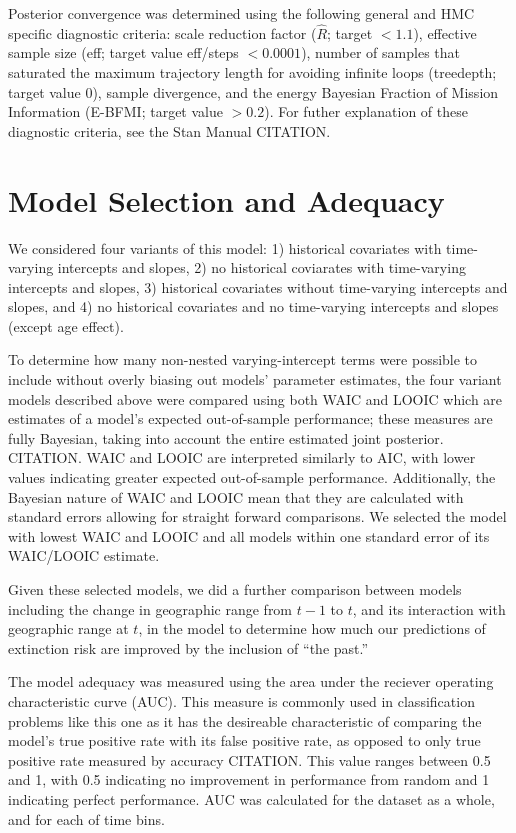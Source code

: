 \documentclass[12pt,letterpaper]{article}
\begin{document}
Posterior convergence was determined using the following general and HMC specific diagnostic criteria: scale reduction factor (\(\hat{R}\); target \(<1.1\)), effective sample size (eff; target value eff/steps \(<0.0001\)), number of samples that saturated the maximum trajectory length for avoiding infinite loops (treedepth; target value 0), sample divergence, and the energy Bayesian Fraction of Mission Information (E-BFMI; target value \(>0.2\)). For futher explanation of these diagnostic criteria, see the Stan Manual CITATION.


\section{Model Selection and Adequacy}

We considered four variants of this model: 1) historical covariates with time-varying intercepts and slopes, 2) no historical coviarates with time-varying intercepts and slopes, 3) historical covariates without time-varying intercepts and slopes, and 4) no historical covariates and no time-varying intercepts and slopes (except age effect).

To determine how many non-nested varying-intercept terms were possible to include without overly biasing out models' parameter estimates, the four variant models described above were compared using both WAIC and LOOIC which are estimates of a model's expected out-of-sample performance; these measures are fully Bayesian, taking into account the entire estimated joint posterior. CITATION. WAIC and LOOIC are interpreted similarly to AIC, with lower values indicating greater expected out-of-sample performance. Additionally, the Bayesian nature of WAIC and LOOIC mean that they are calculated with standard errors allowing for straight forward comparisons. We selected the model with lowest WAIC and LOOIC and all models within one standard error of its WAIC/LOOIC estimate.

Given these selected models, we did a further comparison between models including the change in geographic range from \(t - 1\) to \(t\), and its interaction with geographic range at \(t\), in the model to determine how much our predictions of extinction risk are improved by the inclusion of ``the past.''

The model adequacy was measured using the area under the reciever operating characteristic curve (AUC). This measure is commonly used in classification problems like this one as it has the desireable characteristic of comparing the model's true positive rate with its false positive rate, as opposed to only true positive rate measured by accuracy CITATION. This value ranges between 0.5 and 1, with 0.5 indicating no improvement in performance from random and 1 indicating perfect performance. AUC was calculated for the dataset as a whole, and for each of time bins.
\end{document}
